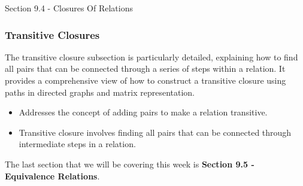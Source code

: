 \begin{notes}{Section 9.4 - Closures Of Relations}
    \subsubsection*{Transitive Closures}
    The transitive closure subsection is particularly detailed, explaining how to find all pairs that can be connected through a series of steps within a relation. It provides a comprehensive view of 
    how to construct a transitive closure using paths in directed graphs and matrix representation.
    \begin{itemize}
        \item Addresses the concept of adding pairs to make a relation transitive.
        \item Transitive closure involves finding all pairs that can be connected through intermediate steps in a relation.
    \end{itemize}
\end{notes}

The last section that we will be covering this week is \textbf{Section 9.5 - Equivalence Relations}.

